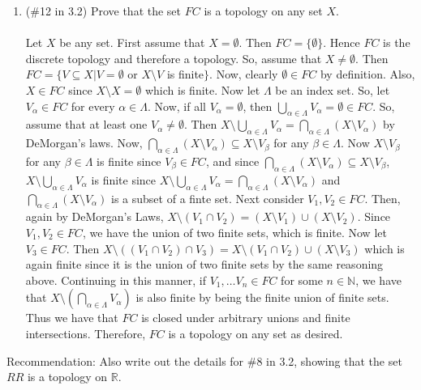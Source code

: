 \documentclass[12pt]{article}
\begin{document}
\begin{enumerate}
\item (\#12 in 3.2) Prove that the set $FC$ is a topology on any set $X$.\\\\
Let $X$ be any set. First assume that $X=\emptyset$. Then $FC=\{\emptyset\}$. Hence $FC$ is the discrete topology and therefore a topology. So, assume that $X\neq\emptyset$. Then $FC=\{V\subseteq X|V=\emptyset$ or $X\setminus V$ is finite$\}$. Now, clearly $\emptyset\in FC$ by definition. Also, $X\in FC$ since $X\setminus X=\emptyset$ which is finite. Now let $\Lambda$ be an index set. So, let $V_{\alpha}\in FC$ for every $\alpha\in\Lambda$. Now, if all $V_{\alpha}=\emptyset$, then $\bigcup_{\alpha\in\Lambda}V_{\alpha}=\emptyset\in FC$. So, assume that at least one $V_{\alpha}\neq\emptyset$. Then $X\setminus\bigcup_{\alpha\in\Lambda}V_{\alpha}=\bigcap_{\alpha\in\Lambda}(X\setminus V_{\alpha})$ by DeMorgan's laws. Now, $\bigcap_{\alpha\in\Lambda}(X\setminus V_{\alpha})\subseteq X\setminus V_{\beta}$ for any $\beta\in\Lambda$. Now $X\setminus V_{\beta}$ for any $\beta\in\Lambda$ is finite since $V_{\beta}\in FC$, and since $\bigcap_{\alpha\in\Lambda}(X\setminus V_{\alpha})\subseteq X\setminus V_{\beta}$, $X\setminus\bigcup_{\alpha\in\Lambda}V_{\alpha}$ is finite since $X\setminus\bigcup_{\alpha\in\Lambda}V_{\alpha}=\bigcap_{\alpha\in\Lambda}(X\setminus V_{\alpha})$ and $\bigcap_{\alpha\in\Lambda}(X\setminus V_{\alpha})$ is a subset of a finte set. Next consider $V_1,V_2\in FC$. Then, again by DeMorgan's Laws, $X\setminus(V_1\cap V_2)=(X\setminus V_1)\cup(X\setminus V_2)$. Since $V_1,V_2\in FC$, we have the union of two finite sets, which is finite. Now let $V_3\in FC$. Then $X\setminus((V_1\cap V_2)\cap V_3)=X\setminus(V_1\cap V_2)\cup(X\setminus V_3)$ which is again finite since it is the union of two finite sets by the same reasoning above. Continuing in this manner, if $V_1,\ldots V_n\in FC$ for some $n\in\mathbb{N}$, we have that $X\setminus(\bigcap_{\alpha\in\Lambda}V_{\alpha})$ is also finite by being the finite union of finite sets. Thus we have that $FC$ is closed under arbitrary unions and finite intersections. Therefore, $FC$ is a topology on any set as desired.
\end{enumerate}

\noindent Recommendation: Also write out the details for \#8 in 3.2, showing that the set $RR$ is a topology on $\mathbb{R}$.
\end{document}
